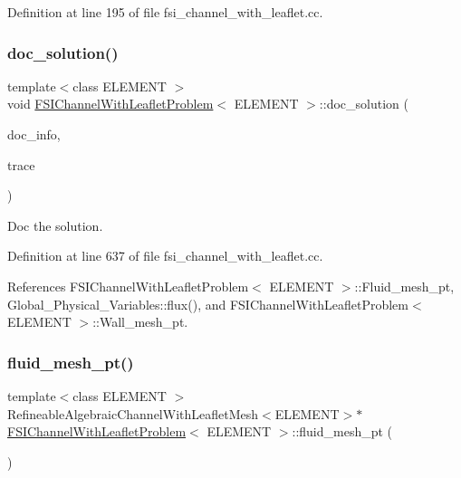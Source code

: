 Definition at line 195 of file fsi\+\_\+channel\+\_\+with\+\_\+leaflet.\+cc.

\mbox{\label{classFSIChannelWithLeafletProblem_a055f124f38dca43bc3ed36b80c5c0880}} 
\subsubsection{\texorpdfstring{doc\+\_\+solution()}{doc\_solution()}}
{\footnotesize\ttfamily template$<$class E\+L\+E\+M\+E\+NT $>$ \\
void \hyperlink{classFSIChannelWithLeafletProblem}{F\+S\+I\+Channel\+With\+Leaflet\+Problem}$<$ E\+L\+E\+M\+E\+NT $>$\+::doc\+\_\+solution (\begin{DoxyParamCaption}\item[{Doc\+Info \&}]{doc\+\_\+info,  }\item[{ofstream \&}]{trace }\end{DoxyParamCaption})}



Doc the solution. 



Definition at line 637 of file fsi\+\_\+channel\+\_\+with\+\_\+leaflet.\+cc.



References F\+S\+I\+Channel\+With\+Leaflet\+Problem$<$ E\+L\+E\+M\+E\+N\+T $>$\+::\+Fluid\+\_\+mesh\+\_\+pt, Global\+\_\+\+Physical\+\_\+\+Variables\+::flux(), and F\+S\+I\+Channel\+With\+Leaflet\+Problem$<$ E\+L\+E\+M\+E\+N\+T $>$\+::\+Wall\+\_\+mesh\+\_\+pt.

\mbox{\label{classFSIChannelWithLeafletProblem_aec9244497829f9a85cbca7307c4d4e10}} 
\subsubsection{\texorpdfstring{fluid\+\_\+mesh\+\_\+pt()}{fluid\_mesh\_pt()}}
{\footnotesize\ttfamily template$<$class E\+L\+E\+M\+E\+NT $>$ \\
Refineable\+Algebraic\+Channel\+With\+Leaflet\+Mesh$<$E\+L\+E\+M\+E\+NT$>$$\ast$ \hyperlink{classFSIChannelWithLeafletProblem}{F\+S\+I\+Channel\+With\+Leaflet\+Problem}$<$ E\+L\+E\+M\+E\+NT $>$\+::fluid\+\_\+mesh\+\_\+pt (\begin{DoxyParamCaption}{ }\end{DoxyParamCaption})\hspace{0.3cm}{\ttfamily [inline]}}



